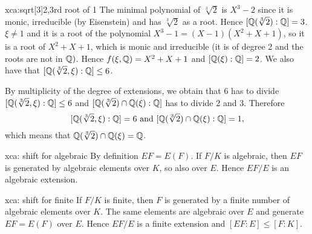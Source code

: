\begin{sol}{xca:sqrt[3]2,3rd root of 1}
The minimal polynomial of $\sqrt[3]{2}$ is $X^3-2$
since it is monic, irreducible (by Eisenstein) and has $\sqrt[3]{2}$
as a root. Hence $[\mathbb{Q}(\sqrt[3]{2}):\mathbb{Q}]=3$.
$\xi\neq 1$ and it is a root of the polynomial $X^3-1=(X-1)(X^2+X+1)$,
so it is a root of $X^2+X+1$, which is monic and
irreducible (it is of degree 2 and the roots are not in $\mathbb{Q})$.
Hence $f(\xi,\mathbb{Q})=X^2+X+1$ and $[\mathbb{Q}(\xi):\mathbb{Q}]=2$.
We also have that $[\mathbb{Q}(\sqrt[3]{2},\xi):\mathbb{Q}]\leq 6$.
    \begin{center}
    \end{center}
By multiplicity of the degree of extensions, we obtain that
6 has to divide $[\mathbb{Q}(\sqrt[3]{2},\xi):\mathbb{Q}]\leq 6$ and
$[\mathbb{Q}(\sqrt[3]{2})\cap\mathbb{Q}(\xi):\mathbb{Q}]$ has to divide 2 and 3.
Therefore 
\[
[\mathbb{Q}(\sqrt[3]{2},\xi):\mathbb{Q}]=6 \text{ and }
[\mathbb{Q}(\sqrt[3]{2})\cap\mathbb{Q}(\xi):\mathbb{Q}]=1,
\]
which means that
$\mathbb{Q}(\sqrt[3]{2})\cap\mathbb{Q}(\xi)=\mathbb{Q}$.
\end{sol}

\begin{sol}{xca: shift for algebraic}
By definition $EF=E(F)$. If $F/K$ is algebraic, then $EF$ is
generated by algebraic elements over $K$, so also over $E$.
Hence $EF/E$ is an algebraic extension.
\end{sol}

\begin{sol}{xca: shift for finite}
If $F/K$ is finite,
then $F$ is generated by a finite number of algebraic elements over $K$.
The same elements are algebraic over $E$ and generate $EF=E(F)$ over $E$.
Hence $EF/E$ is a finite extension and $[EF:E]\leq [F:K]$.
\end{sol}

